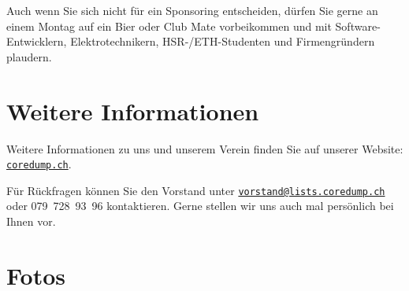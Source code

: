 \documentclass[10pt,a4paper,parskip,fleqn]{scrartcl}
\begin{document}
Auch wenn Sie sich nicht für ein Sponsoring entscheiden, dürfen Sie gerne an
einem Montag auf ein Bier oder Club Mate vorbeikommen und mit
Software-Entwicklern, Elektrotechnikern, HSR-/ETH-Studenten und Firmengründern
plaudern.

\newpage
\section{Weitere Informationen}

Weitere Informationen zu uns und unserem Verein finden Sie auf unserer Website:
\href{https://www.coredump.ch/}{\texttt{coredump.ch}}.

Für Rückfragen können Sie den Vorstand unter
\href{mailto:vorstand@lists.coredump.ch}{\texttt{vorstand@lists.coredump.ch}}
oder 079~728~93~96 kontaktieren. Gerne stellen wir uns auch mal persönlich bei
Ihnen vor.

\section{Fotos}
\end{document}
